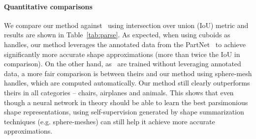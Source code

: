 \paragraph{Quantitative comparisons}

We compare our method against~\cite{Tulsiani2017, Paschalidou2019} using intersection
over union (IoU) metric and results are shown in Table~\ref{tab:parse}.
As expected, when using cuboids as handles, our method leverages the annotated data from the PartNet~\cite{partnet} to achieve significantly more accurate shape
approximations (more than twice the IoU in comparison).
On the other hand, as~\cite{Tulsiani2017, Paschalidou2019} are trained without leveraging annotated data, a more fair comparison is between theirs and our method using sphere-mesh handles, which are computed automatically.
Our method still clearly outperforms theirs in all categories --
chairs, airplanes and animals.
This shows that even though a neural network in theory should be able to learn the best parsimonious
shape representations, using self-supervision generated by shape summarization techniques (e.g. sphere-meshes) can still help it achieve more accurate approximations. 

